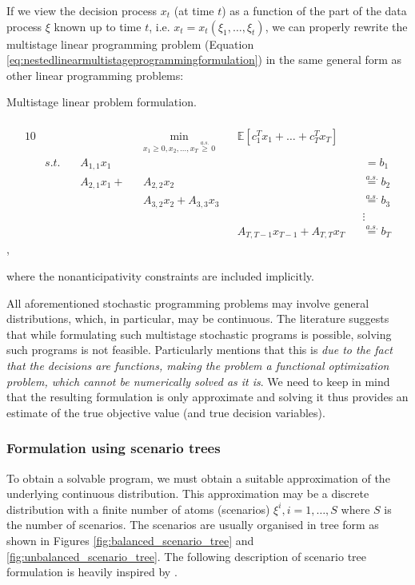 If we view the decision process $x_t$ (at time $t$) as a function of the part of the data process $\xi$ known up to time $t$, i.e. $x_t=x_t(\xi_1,\dots,\xi_t)$, we can properly rewrite the multistage linear programming problem (Equation \ref{eq:nestedlinearmultistageprogrammingformulation}) in the same general form as other linear programming problems:
\begin{defn}
{Multistage linear problem formulation. \\ \cite[Ch. 1, p. 22]{stochasticprogrammingbible}} \\
\footnotesize
\begin{alignat}{10}
\label{eq:staircaselinearprogrammingformulation}
& &&  && \underset{x_1 \geq 0, x_2,\dots,x_T \overset{a.s.}{\geq} 0}{\mathrm{min}}  &&  \mathbb{E}\left[ c_1^Tx_1 + \dots +  c_T^Tx_T \right] && \\
& s.t. \, && A_{1,1}x_1 && && && \,=b_1 \nonumber \\
& && A_{2,1}x_1 +  && A_{2,2}x_2 && && \overset{a.s.}{=}b_2 \nonumber \\
& && && A_{3,2}x_2  +  A_{3,3}x_3 && && \overset{a.s.}{=}b_3 \nonumber \\
& && && && && \vdots \nonumber \\
& && && && A_{T,T-1}x_{T-1}  +  A_{T,T}x_T  && \overset{a.s.}{=}b_T \nonumber
\end{alignat}
\normalsize
,
\end{defn}
where the nonanticipativity constraints are included implicitly.

All aforementioned stochastic programming problems may involve general distributions, which, in particular, may be continuous. The literature suggests that while formulating such multistage stochastic programs is possible, solving such programs is not feasible. Particularly \cite{pflugscenariotreegeneration} mentions that this is \textit{due to the fact that the decisions are functions, making the problem a functional optimization problem, which cannot be numerically solved as it is}. We need to keep in mind that the resulting formulation is only approximate and solving it thus provides an estimate of the true objective value (and true decision variables).
\subsubsection{Formulation using scenario trees} 
To obtain a solvable program, we must obtain a suitable approximation of the underlying continuous distribution. This approximation may be a discrete distribution with a finite number of atoms (scenarios) $\xi^i, i=1,\dots,S$ where $S$ is the number of scenarios. The scenarios are usually organised in tree form as shown in Figures \ref{fig:balanced_scenario_tree} and \ref{fig:unbalanced_scenario_tree}. The following description of scenario tree formulation is heavily inspired by \cite[Section 2]{dupacova_scenarios_for_multistage_stochastic_programs}.

